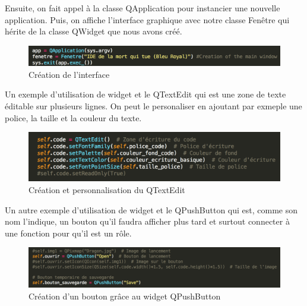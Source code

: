\documentclass[a4paper,12pt]{article}
\begin{document}
		Ensuite, on fait appel à la classe QApplication pour instancier une nouvelle application. Puis, on affiche l'interface graphique avec notre classe Fenêtre qui hérite de la classe QWidget que nous avons créé. 
		\newpage
		\begin{figure}[!h]

			\begin{center}

				\includegraphics[scale=0.8]{"images/QApplication"}

				\caption{Création de l'interface}

			\end{center}

		\end{figure}

		Un exemple d'utilisation de widget et le QTextEdit qui est une zone de texte éditable sur plusieurs lignes. On peut le personaliser en ajoutant par exmeple une police, la taille et la couleur du texte.

		\begin{figure}[!h]

			\begin{center}

				\includegraphics[scale=0.8]{"images/QTextEdit"}

				\caption{Création et personnalisation du QTextEdit}
			\end{center}

		\end{figure}

		Un autre exemple d'utilisation de widget et le QPushButton qui est, comme son nom l'indique, un bouton qu'il faudra afficher plus tard et surtout connecter à une fonction pour qu'il est un rôle.

		\begin{figure}[!h]

			\begin{center}

				\includegraphics[scale=0.7]{"images/QPushButton"}

				\caption{Création d'un bouton grâce au widget QPushButton}
			\end{center}

		\end{figure}
\end{document}

